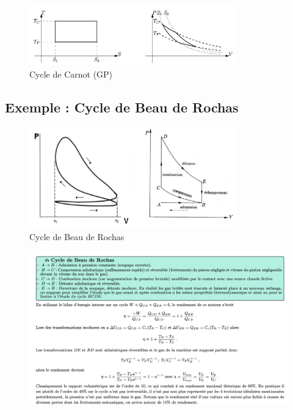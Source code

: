 \begin{figure}[H] %
  \centering
  \includegraphics[width=0.8\textwidth]{./assets/Cycle de Carnot (GP).png}
  \caption{Cycle de Carnot (GP)}
  \label{fig:Cycle de Carnot (GP).png}
\end{figure}



\subsection{Exemple : Cycle de Beau de Rochas} %
\label{sub:Exemple : Cycle de Beau de Rochas}

\begin{figure}[H] %
  \centering
  \includegraphics[width=0.8\textwidth]{./assets/Cycle de Beau de Rochas 1.png}
  \caption{Cycle de Beau de Rochas}
\end{figure}

\begin{figure}[H] %
  \centering
  \includegraphics[width=1\textwidth]{./assets/Cycle de Beau de Rochas 2.png}
\end{figure}




